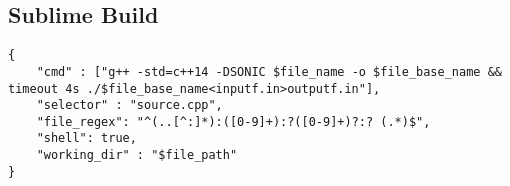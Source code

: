 \subsection*{Sublime Build}
\begin{lstlisting}
{
    "cmd" : ["g++ -std=c++14 -DSONIC $file_name -o $file_base_name && timeout 4s ./$file_base_name<inputf.in>outputf.in"], 
    "selector" : "source.cpp",
    "file_regex": "^(..[^:]*):([0-9]+):?([0-9]+)?:? (.*)$",
    "shell": true,
    "working_dir" : "$file_path"
}
\end{lstlisting}

